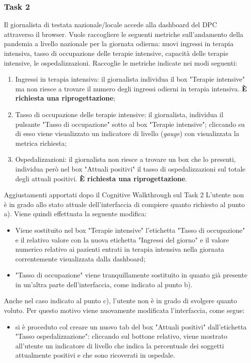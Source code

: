 \subsubsection{Task 2}
\label{sss:cw-task-2}

Il giornalista di testata nazionale/locale accede alla dashboard del DPC attraverso il browser.
Vuole raccogliere le seguenti metriche sull'andamento della pandemia a livello nazionale per la giornata odierna: nuovi ingressi in terapia intensiva, tasso di occupazione delle terapie intensive, capacità delle terapie intensive, le ospedalizzazioni.
Raccoglie le metriche indicate nei modi seguenti:
\begin{enumerate}[label=\alph*.]
    \item Ingressi in terapia intensiva: il giornalista individua il box "Terapie intensive" ma non riesce a trovare il numero degli ingressi odierni in terapia intensiva. \textbf{È richiesta una riprogettazione};
    \item Tasso di occupazione delle terapie intensive: il giornalista, individua il pulsante "Tasso di occupazione" sotto al box "Terapie intensive"; cliccando su di esso viene visualizzato un indicatore di livello (\textit{gauge}) con visualizzata la metrica richiesta;
    \item Ospedalizzazioni: il giornalista non riesce a trovare un box che lo presenti, individua però nel box "Attuali positivi" il tasso di ospedalizzazioni sul totale degli attuali positivi. \textbf{È richiesta una riprogettazione}.
\end{enumerate}

\begin{bclogo}{Aggiustamenti apportati dopo il Cognitive Walkthrough sul Task 2}
    L'utente non è in grado allo stato attuale dell'interfaccia di compiere quanto richiesto al punto a).
    Viene quindi effettuata la seguente modifica:
    \begin{itemize}
        \item Viene sostituito nel box "Terapie intensive" l'etichetta "Tasso di occupazione" e il relativo valore con la nuova etichetta "Ingressi del giorno" e il valore numerico relativo ai pazienti entrati in terapia intensiva nella giornata correntemente visualizzata dalla dashboard;
        \item "Tasso di occupazione" viene tranquillamente sostituito in quanto già presente in un'altra parte dell'interfaccia, come indicato al punto b).
    \end{itemize}
    Anche nel caso indicato al punto c), l'utente non è in grado di svolgere quanto voluto.
    Per questo motivo viene nuovamente modificata l'interfaccia, come segue:
    \begin{itemize}
        \item si è proceduto col creare un nuovo tab del box "Attuali positivi" dall'etichetta "Tasso ospedalizzazione": cliccando sul bottone relativo, viene mostrato all'utente un indicatore di livello che indica la percentuale dei soggetti attualmente positivi e che sono ricoverati in ospedale.
    \end{itemize}
\end{bclogo}